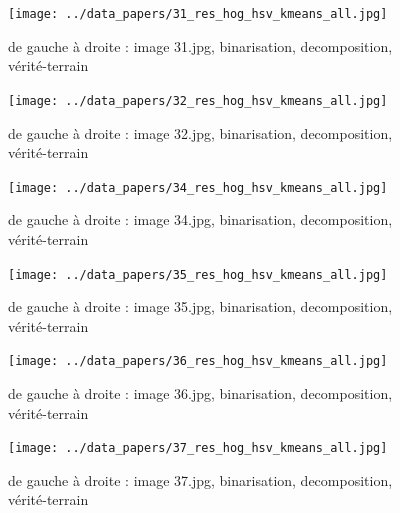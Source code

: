 \documentclass{book}
\begin{document}
\begin{figure}[H]
\begin{center}
\texttt{[image: ../data\_papers/31\_res\_hog\_hsv\_kmeans\_all.jpg]}
\end{center}
\caption{de gauche à droite : image 31.jpg, binarisation, decomposition, vérité-terrain}
\label{31}
\end{figure}
\clearpage


\begin{figure}[H]
\begin{center}
\texttt{[image: ../data\_papers/32\_res\_hog\_hsv\_kmeans\_all.jpg]}
\end{center}
\caption{de gauche à droite : image 32.jpg, binarisation, decomposition, vérité-terrain}
\label{32}
\end{figure}
\clearpage


\begin{figure}[H]
\begin{center}
\texttt{[image: ../data\_papers/34\_res\_hog\_hsv\_kmeans\_all.jpg]}
\end{center}
\caption{de gauche à droite : image 34.jpg, binarisation, decomposition, vérité-terrain}
\label{34}
\end{figure}
\clearpage


\begin{figure}[H]
\begin{center}
\texttt{[image: ../data\_papers/35\_res\_hog\_hsv\_kmeans\_all.jpg]}
\end{center}
\caption{de gauche à droite : image 35.jpg, binarisation, decomposition, vérité-terrain}
\label{35}
\end{figure}
\clearpage


\begin{figure}[H]
\begin{center}
\texttt{[image: ../data\_papers/36\_res\_hog\_hsv\_kmeans\_all.jpg]}
\end{center}
\caption{de gauche à droite : image 36.jpg, binarisation, decomposition, vérité-terrain}
\label{36}
\end{figure}
\clearpage


\begin{figure}[H]
\begin{center}
\texttt{[image: ../data\_papers/37\_res\_hog\_hsv\_kmeans\_all.jpg]}
\end{center}
\caption{de gauche à droite : image 37.jpg, binarisation, decomposition, vérité-terrain}
\label{37}
\end{figure}
\clearpage
\end{document}
